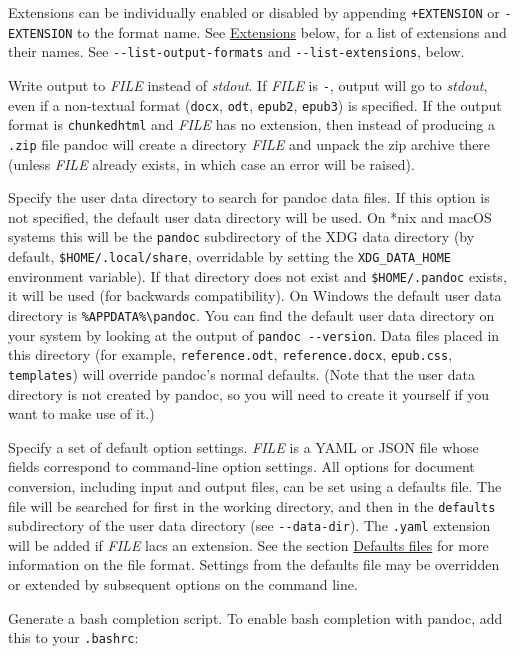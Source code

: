 \documentclass[
]{article}
\begin{document}
\begin{description}
Extensions can be individually enabled or disabled by appending
\texttt{+EXTENSION} or \texttt{-EXTENSION} to the format name. See
\protect\hyperlink{extensions}{Extensions} below, for a list of
extensions and their names. See \texttt{-\/-list-output-formats} and
\texttt{-\/-list-extensions}, below.
\item[\texttt{-o} \emph{FILE}, \texttt{-\/-output=}\emph{FILE}]
Write output to \emph{FILE} instead of \emph{stdout}. If \emph{FILE} is
\texttt{-}, output will go to \emph{stdout}, even if a non-textual
format (\texttt{docx}, \texttt{odt}, \texttt{epub2}, \texttt{epub3}) is
specified. If the output format is \texttt{chunkedhtml} and \emph{FILE}
has no extension, then instead of producing a \texttt{.zip} file pandoc
will create a directory \emph{FILE} and unpack the zip archive there
(unless \emph{FILE} already exists, in which case an error will be
raised).
\item[\texttt{-\/-data-dir=}\emph{DIRECTORY}]
Specify the user data directory to search for pandoc data files. If this
option is not specified, the default user data directory will be used.
On *nix and macOS systems this will be the \texttt{pandoc} subdirectory
of the XDG data directory (by default, \texttt{\$HOME/.local/share},
overridable by setting the \texttt{XDG\_DATA\_HOME} environment
variable). If that directory does not exist and \texttt{\$HOME/.pandoc}
exists, it will be used (for backwards compatibility). On Windows the
default user data directory is
\texttt{\%APPDATA\%\textbackslash{}pandoc}. You can find the default
user data directory on your system by looking at the output of
\texttt{pandoc\ -\/-version}. Data files placed in this directory (for
example, \texttt{reference.odt}, \texttt{reference.docx},
\texttt{epub.css}, \texttt{templates}) will override pandoc's normal
defaults. (Note that the user data directory is not created by pandoc,
so you will need to create it yourself if you want to make use of it.)
\item[\texttt{-d} \emph{FILE}, \texttt{-\/-defaults=}\emph{FILE}]
Specify a set of default option settings. \emph{FILE} is a YAML or JSON
file whose fields correspond to command-line option settings. All
options for document conversion, including input and output files, can
be set using a defaults file. The file will be searched for first in the
working directory, and then in the \texttt{defaults} subdirectory of the
user data directory (see \texttt{-\/-data-dir}). The \texttt{.yaml}
extension will be added if \emph{FILE} lacs an extension. See the
section \protect\hyperlink{defaults-files}{Defaults files} for more
information on the file format. Settings from the defaults file may be
overridden or extended by subsequent options on the command line.
\item[\texttt{-\/-bash-completion}]
Generate a bash completion script. To enable bash completion with
pandoc, add this to your \texttt{.bashrc}:


\end{description}
\end{document}
